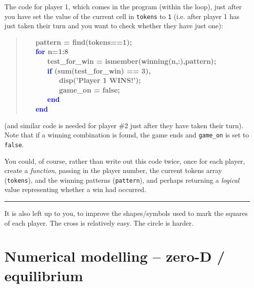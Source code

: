 \documentclass{tufte-book} %
\newenvironment{docspecbold}{\begin{quotation}\ttfamily\bfseries\parskip0pt\parindent0pt\ignorespaces}{\end{quotation}}
\begin{document}
\vspace{16mm}
\pagebreak

The code for player 1, which comes in the program (within the loop), just after you have set the value of the current cell in \texttt{tokens} to \texttt{1} (i.e. after player 1 has just taken their turn and you want to check whether they have just one):

\begin{docspecbold}
\ \ \             pattern = find(tokens==1);\\
\ \ \             \textcolor{blue}{for} n=1:8\\
\ \ \ \ \ \                 test\_for\_win = ismember(winning(n,:),pattern);\\
\ \ \ \ \ \                 \textcolor{blue}{if} (sum(test\_for\_win) == 3),\\
\ \ \ \ \ \ \ \ \                     disp(\textcolor[rgb]{1,0,1}{'Player 1 WINS!'});\\
\ \ \ \ \ \ \ \ \                     game\_on = false;\\
\ \ \ \ \ \                 \textcolor{blue}{end}\\
\ \ \             \textcolor{blue}{end}
\end{docspecbold}
(and similar code is needed for player \#2 just after they have taken their turn). Note that if a winning combination is found, the game ends and \texttt{game\_on} is set to \texttt{false}.

You could, of course, rather than write out this code twice, once for each player, create a \textit{function}, passing in the player number, the current tokens array (\texttt{tokens}), and the winning patterns (\texttt{pattern}), and perhaps returning a \textit{logical} value representing whether a win had occurred.

\vspace{1mm}
\noindent\rule{4cm}{0.5pt}
\vspace{2mm}

\noindent It is also left up to you, to improve the shapes/symbols used to mark the squares of each player. The cross is relatively easy. The circle is harder.


\chapter{Numerical modelling -- zero-D / equilibrium}
\label{ch:06}
\end{document}
